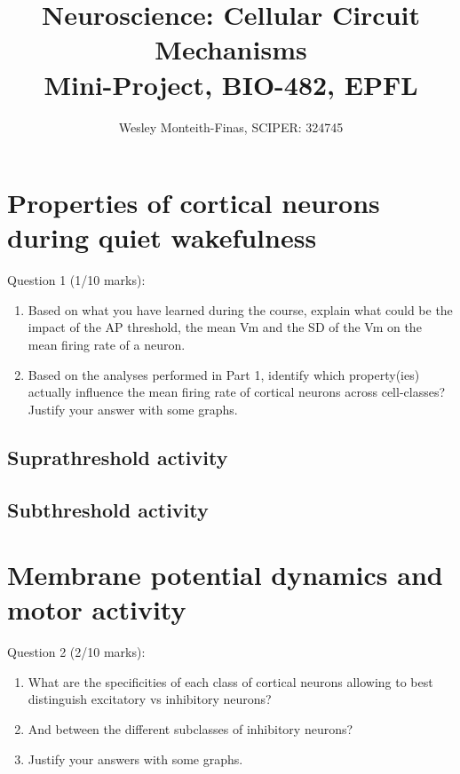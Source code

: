 \documentclass{IEEEtran}
\begin{document}
\title{
  Neuroscience: Cellular Circuit Mechanisms \\
  Mini-Project, BIO-482, EPFL
}
\author{
  Wesley Monteith-Finas, SCIPER: 324745
}
\maketitle

\section{Properties of cortical neurons during quiet wakefulness}

Question 1 (1/10 marks):
\begin{enumerate}
  \item Based on what you have learned during the course, explain what could be the impact of the AP threshold, the mean Vm and the SD of the Vm on the mean firing rate of a neuron. 
  \item 
  Based on the analyses performed in Part 1, identify which property(ies) actually influence the mean firing rate of cortical neurons across cell-classes? Justify your answer with some graphs.
\end{enumerate}

\subsection{Suprathreshold activity}

\subsection{Subthreshold activity}

\section{Membrane potential dynamics and motor activity}

Question 2 (2/10 marks):
\begin{enumerate}
  \item What are the specificities of each class of cortical neurons allowing to best distinguish excitatory vs inhibitory neurons?
  \item And between the different subclasses of inhibitory neurons?
  \item Justify your answers with some graphs.
\end{enumerate}
\end{document}
